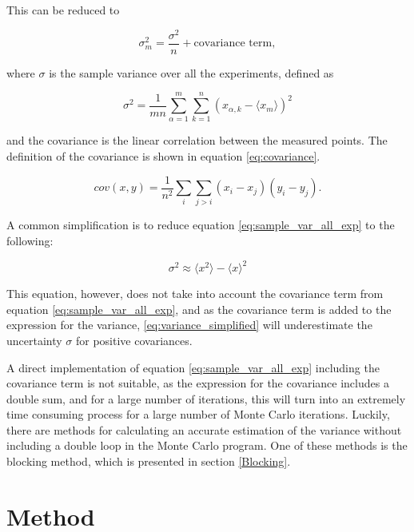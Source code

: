 \documentclass[norsk,a4paper,12pt]{article}
\begin{document}
This can be reduced to 

\begin{equation}
\label{eq:sample_var_all_exp}
\sigma_m^2 = \frac{\sigma^2}{n} + \text{covariance term},
\end{equation}

where $\sigma$ is the sample variance over all the experiments, defined as 

\begin{equation}
\sigma^2 = \frac{1}{mn} \sum_{\alpha=1}^m \sum_{k=1}^n (x_{\alpha, k} - \langle x_m \rangle )^2
\end{equation}

and the covariance is the linear correlation between the measured points. The definition of the covariance is shown in equation \ref{eq:covariance}.

\begin{equation}
\label{eq:covariance}
cov(x,y) = \frac{1}{n^2} \sum_i \sum_{j >i} (x_i - x_j) (y_i - y_j).
\end{equation}

A common simplification is to reduce equation \ref{eq:sample_var_all_exp} to the following:

\begin{equation}
\label{eq:variance_simplified}
\sigma^2 \approx \langle x^2 \rangle - \langle x \rangle^2
\end{equation}

This equation, however, does not take into account the covariance term from equation \ref{eq:sample_var_all_exp}, and as the covariance term is added to the expression for the variance, \ref{eq:variance_simplified} will underestimate the uncertainty $\sigma$ for positive covariances.

A direct implementation of equation \ref{eq:sample_var_all_exp} including the covariance term is not suitable, as the expression for the covariance includes a double sum, and for a large number of iterations, this will turn into an extremely time consuming process for a large number of Monte Carlo iterations. Luckily, there are methods for calculating an accurate estimation of the variance without including a double loop in the Monte Carlo program. One of these methods is the blocking method, which is presented in section \ref{Blocking}.

\section{Method} \label{Method}
\end{document}
